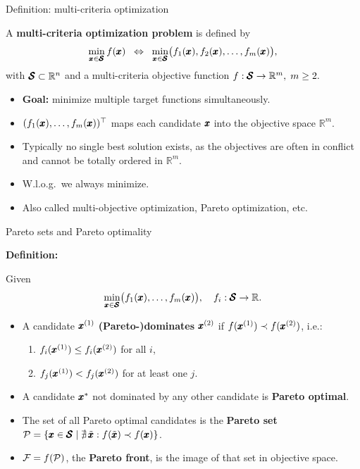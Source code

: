 \documentclass[11pt,compress,t,notes=noshow,xcolor=table]{beamer}
\begin{document}
\begin{vbframe}{Definition: multi-criteria optimization}

A \textbf{multi-criteria optimization problem} is defined by
\[
\min_{\pmb{x} \in \pmb{\mathcal{S}}}  f(\pmb{x}) 
\;\;\Leftrightarrow\;\;
\min_{\pmb{x} \in \pmb{\mathcal{S}}} 
\bigl(f_1(\pmb{x}), f_2(\pmb{x}), \dots, f_m(\pmb{x})\bigr),
\]
with \(\pmb{\mathcal{S}} \subset \mathbb{R}^n\) and a multi-criteria objective function
\(f: \pmb{\mathcal{S}} \to \mathbb{R}^m,\; m \ge 2.\)

\begin{itemize}
\item \textbf{Goal:} minimize multiple target functions simultaneously.
\item \((f_1(\pmb{x}), \dots, f_m(\pmb{x}))^\top\) maps each candidate 
      \(\pmb{x}\) into the objective space \(\mathbb{R}^m\).
\item Typically no single best solution exists, as the objectives are often 
      in conflict and cannot be totally ordered in \(\mathbb{R}^m\).
\item W.l.o.g.\ we always minimize.
\item Also called multi-objective optimization, Pareto optimization, etc.
\end{itemize}

\end{vbframe}

\begin{vbframe}{Pareto sets and Pareto optimality}

\textbf{Definition:}

Given 
\[
\min_{\pmb{x} \in \pmb{\mathcal{S}}} 
   \bigl(f_1(\pmb{x}), \dots, f_m(\pmb{x})\bigr), 
\quad f_i: \pmb{\mathcal{S}} \to \mathbb{R}.
\]

\begin{itemize}
  \item A candidate \(\pmb{x}^{(1)}\) \textbf{(Pareto-)dominates} \(\pmb{x}^{(2)}\) 
        if \(f(\pmb{x}^{(1)}) \prec f(\pmb{x}^{(2)})\), i.e.:
    \begin{enumerate}
      \item \(f_i(\pmb{x}^{(1)}) \le f_i(\pmb{x}^{(2)})\) for all \(i\),
      \item \(f_j(\pmb{x}^{(1)}) < f_j(\pmb{x}^{(2)})\) for at least one \(j\).
    \end{enumerate}
    \item A candidate \({\pmb{x}}^*\) not dominated by any other candidate is 
          \textbf{Pareto optimal}.
    \item The set of all Pareto optimal candidates is the \textbf{Pareto set} 
          \(\mathcal{P} = \{\pmb{x} \in \pmb{\mathcal{S}} \mid \nexists \,\tilde{\pmb{x}} :
               f(\tilde{\pmb{x}}) \prec f(\pmb{x})\}\).
    \item \(\mathcal{F} = f(\mathcal{P})\), the \textbf{Pareto front}, 
          is the image of that set in objective space.
\end{itemize}

\end{vbframe}
\end{document}

